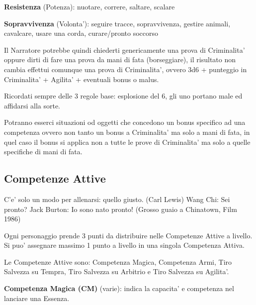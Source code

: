 \documentclass[a4paper,11pt,twoside,openany]{dndbook}
\begin{document}
\textbf{Resistenza} (Potenza): nuotare, correre, saltare, scalare

\textbf{Sopravvivenza} (Volonta'): seguire tracce, sopravvivenza, gestire animali, cavalcare, usare una corda, curare/pronto soccorso

\bigskip

Il Narratore potrebbe quindi chiederti genericamente una prova di
Criminalita' oppure dirti di fare una prova da mani di fata (borseggiare),
il risultato non cambia effettui comunque una prova di Criminalita',
ovvero 3d6 + punteggio in Criminalita' + Agilita' + eventuali bonus
o malus.

Ricordati sempre delle 3 regole base: esplosione del 6, gli uno portano
male ed affidarsi alla sorte.

\bigskip

Potranno esserci situazioni od oggetti che concedono un bonus specifico ad una competenza ovvero non tanto un bonus a Criminalita' ma solo a mani di fata, in quel caso il bonus si applica non a tutte le prove di Criminalita' ma solo a quelle specifiche di mani di fata.


\pagebreak

\subsection{Competenze Attive}

\label{competenze-attive}
\begin{quotebox}C'e' solo un modo per allenarsi: quello giusto. (Carl Lewis)\linebreak\linebreak
Wang Chi: Sei pronto?\linebreak
Jack Burton: Io sono nato pronto! (Grosso guaio a Chinatown, Film 1986)
\end{quotebox}

Ogni personaggio prende 3 punti da distribuire nelle Competenze Attive a livello. Si puo' assegnare massimo 1 punto a livello in una singola Competenza Attiva.

Le Competenze Attive sono: Competenza Magica, Competenza Armi, Tiro Salvezza su Tempra, Tiro Salvezza su Arbitrio e Tiro Salvezza su Agilita'.

\textbf{Competenza Magica (CM)} (varie): indica la capacita' e competenza nel lanciare una Essenza.
\end{document}
